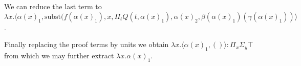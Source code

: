 \documentclass[onehalfspacing]{article}
\begin{document}
\hfill
\\\\\hspace{2cm}We can reduce the last term to $\lambda x.\langle \alpha(x)_1, \text{subst}(f(\alpha(x)_1),x,\Pi_tQ(t, \alpha(x)_1),\alpha(x)_2,\beta(\alpha(x)_1)(\gamma(\alpha(x)_1))\rangle$.

\noindent Finally replacing the proof terms by units we obtain $\lambda x.\langle \alpha(x)_1, ()\rangle : \Pi_x\Sigma_y \top$ from which we may further extract $\lambda x. \alpha(x)_1$.


\pagebreak


\end{document}
